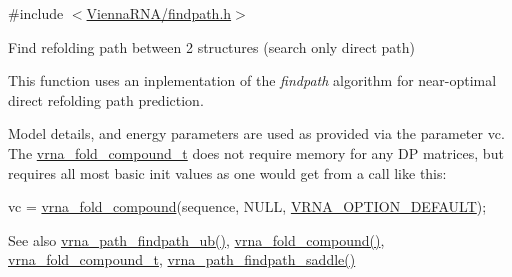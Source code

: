{\ttfamily \#include $<$\mbox{\hyperlink{findpath_8h}{Vienna\+R\+N\+A/findpath.\+h}}$>$}



Find refolding path between 2 structures (search only direct path) 

This function uses an inplementation of the {\itshape findpath} algorithm \cite{flamm:2001} for near-\/optimal direct refolding path prediction.

Model details, and energy parameters are used as provided via the parameter \textquotesingle{}vc\textquotesingle{}. The \mbox{\hyperlink{group__fold__compound_ga1b0cef17fd40466cef5968eaeeff6166}{vrna\+\_\+fold\+\_\+compound\+\_\+t}} does not require memory for any DP matrices, but requires all most basic init values as one would get from a call like this\+: 
\begin{DoxyCode}
vc = \mbox{\hyperlink{group__fold__compound_ga6601d994ba32b11511b36f68b08403be}{vrna\_fold\_compound}}(sequence, NULL, \mbox{\hyperlink{group__fold__compound_gacea5b7ee6181c485f36e2afa0e9089e4}{VRNA\_OPTION\_DEFAULT}});
\end{DoxyCode}


\begin{DoxySeeAlso}{See also}
\mbox{\hyperlink{group__direct__paths_ga8d47812616303f40057dfb033869863a}{vrna\+\_\+path\+\_\+findpath\+\_\+ub()}}, \mbox{\hyperlink{group__fold__compound_ga6601d994ba32b11511b36f68b08403be}{vrna\+\_\+fold\+\_\+compound()}}, \mbox{\hyperlink{group__fold__compound_ga1b0cef17fd40466cef5968eaeeff6166}{vrna\+\_\+fold\+\_\+compound\+\_\+t}}, \mbox{\hyperlink{group__direct__paths_gad611574a76593e26021f177e7854b6b4}{vrna\+\_\+path\+\_\+findpath\+\_\+saddle()}}
\end{DoxySeeAlso}

